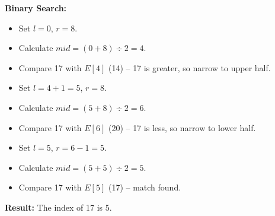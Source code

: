 \textbf{Binary Search:}
\begin{itemize}
    \item Set $l = 0$, $r = 8$.
    \item Calculate $mid = (0 + 8) \div 2 = 4$.
    \item Compare 17 with $E[4]$ (14) -- 17 is greater, so narrow to upper half.
    \item Set $l = 4 + 1 = 5$, $r = 8$.
    \item Calculate $mid = (5 + 8) \div 2 = 6$.
    \item Compare 17 with $E[6]$ (20) -- 17 is less, so narrow to lower half.
    \item Set $l = 5$, $r = 6 - 1 = 5$.
    \item Calculate $mid = (5 + 5) \div 2 = 5$.
    \item Compare 17 with $E[5]$ (17) -- match found.
\end{itemize}


\textbf{Result:} The index of 17 is 5.